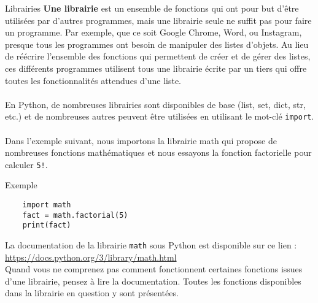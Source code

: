 \begin{section}{Librairies}
    \textbf{Une librairie} est un ensemble de fonctions qui ont pour but d'être utilisées par d'autres programmes, mais une librairie seule ne suffit pas pour faire un programme. Par exemple, que ce soit Google Chrome, Word, ou Instagram, presque tous les programmes ont besoin de manipuler des listes d'objets. Au lieu de réécrire l'ensemble des fonctions qui permettent de créer et de gérer des listes, ces différents programmes utilisent tous une librairie écrite par un tiers qui offre toutes les fonctionnalités attendues d'une liste.
\\\\
En Python, de nombreuses librairies sont disponibles de base (list, set, dict, str, etc.) et de nombreuses autres peuvent être utilisées en utilisant le mot-clé \lstinline{import}.
\\\\
Dans l'exemple suivant, nous importons la librairie math qui propose de nombreuses fonctions mathématiques et nous essayons la fonction factorielle pour calculer \lstinline{5!}.
\begin{Example}{\faTerminal Exemple}
    \begin{lstlisting}
    import math
    fact = math.factorial(5)
    print(fact)\end{lstlisting}
\end{Example}

\begin{conseil}
	La documentation de la librairie \lstinline{math} sous Python est disponible sur ce lien : \url{https://docs.python.org/3/library/math.html} \\
Quand vous ne comprenez pas comment fonctionnent certaines fonctions issues d'une librairie, pensez à lire la documentation. Toutes les fonctions disponibles dans la librairie en question y sont présentées.


\end{conseil}
\end{section}
